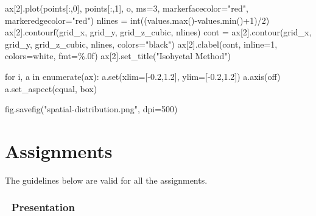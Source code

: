 \documentclass[
  letterpaper,
  DIV=11,
  numbers=noendperiod]{scrreprt}
\newenvironment{Shaded}{\begin{snugshade}}{\end{snugshade}}
\newcommand{\BuiltInTok}[1]{\textcolor[rgb]{0.00,0.23,0.31}{#1}}
\newcommand{\ControlFlowTok}[1]{\textcolor[rgb]{0.00,0.23,0.31}{#1}}
\newcommand{\DecValTok}[1]{\textcolor[rgb]{0.68,0.00,0.00}{#1}}
\newcommand{\FloatTok}[1]{\textcolor[rgb]{0.68,0.00,0.00}{#1}}
\newcommand{\KeywordTok}[1]{\textcolor[rgb]{0.00,0.23,0.31}{#1}}
\newcommand{\NormalTok}[1]{\textcolor[rgb]{0.00,0.23,0.31}{#1}}
\newcommand{\OperatorTok}[1]{\textcolor[rgb]{0.37,0.37,0.37}{#1}}
\newcommand{\StringTok}[1]{\textcolor[rgb]{0.13,0.47,0.30}{#1}}
\begin{document}
\begin{Shaded}
\begin{Highlighting}[]
\NormalTok{ax[}\DecValTok{2}\NormalTok{].plot(points[:,}\DecValTok{0}\NormalTok{], points[:,}\DecValTok{1}\NormalTok{], }\StringTok{\textquotesingle{}o\textquotesingle{}}\NormalTok{, ms}\OperatorTok{=}\DecValTok{3}\NormalTok{, markerfacecolor}\OperatorTok{=}\StringTok{"red"}\NormalTok{, markeredgecolor}\OperatorTok{=}\StringTok{"red"}\NormalTok{)}
\NormalTok{nlines }\OperatorTok{=} \BuiltInTok{int}\NormalTok{((values.}\BuiltInTok{max}\NormalTok{()}\OperatorTok{{-}}\NormalTok{values.}\BuiltInTok{min}\NormalTok{()}\OperatorTok{+}\DecValTok{1}\NormalTok{)}\OperatorTok{/}\DecValTok{2}\NormalTok{)}
\NormalTok{ax[}\DecValTok{2}\NormalTok{].contourf(grid\_x, grid\_y, grid\_z\_cubic, nlines)}
\NormalTok{cont }\OperatorTok{=}\NormalTok{ ax[}\DecValTok{2}\NormalTok{].contour(grid\_x, grid\_y, grid\_z\_cubic, nlines, colors}\OperatorTok{=}\StringTok{"black"}\NormalTok{)}
\NormalTok{ax[}\DecValTok{2}\NormalTok{].clabel(cont, inline}\OperatorTok{=}\DecValTok{1}\NormalTok{, colors}\OperatorTok{=}\StringTok{\textquotesingle{}white\textquotesingle{}}\NormalTok{, fmt}\OperatorTok{=}\StringTok{\textquotesingle{}\%.0f\textquotesingle{}}\NormalTok{)}
\NormalTok{ax[}\DecValTok{2}\NormalTok{].set\_title(}\StringTok{"Isohyetal Method"}\NormalTok{)}

\ControlFlowTok{for}\NormalTok{ i, a }\KeywordTok{in} \BuiltInTok{enumerate}\NormalTok{(ax):}
\NormalTok{    a.}\BuiltInTok{set}\NormalTok{(xlim}\OperatorTok{=}\NormalTok{[}\OperatorTok{{-}}\FloatTok{0.2}\NormalTok{,}\FloatTok{1.2}\NormalTok{], ylim}\OperatorTok{=}\NormalTok{[}\OperatorTok{{-}}\FloatTok{0.2}\NormalTok{,}\FloatTok{1.2}\NormalTok{])}
\NormalTok{    a.axis(}\StringTok{\textquotesingle{}off\textquotesingle{}}\NormalTok{)}
\NormalTok{    a.set\_aspect(}\StringTok{\textquotesingle{}equal\textquotesingle{}}\NormalTok{, }\StringTok{\textquotesingle{}box\textquotesingle{}}\NormalTok{)}

\NormalTok{fig.savefig(}\StringTok{"spatial{-}distribution.png"}\NormalTok{, dpi}\OperatorTok{=}\DecValTok{500}\NormalTok{)}
\end{Highlighting}
\end{Shaded}

\part{Assignments}

The guidelines below are valid for all the assignments.

\hypertarget{presentation}{%
\section*{🌅 Presentation}\label{presentation}}
\end{document}

